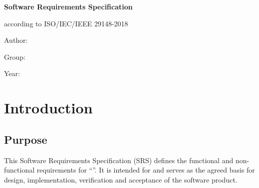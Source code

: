 \documentclass[12pt,a4paper]{extarticle}
\begin{document}
\sloppy

\begin{center}
{\large\bfseries Software Requirements Specification\par}
\vspace{2pt}
{\normalsize according to ISO/IEC/IEEE 29148-2018\par}
\vspace{16pt}
{\large\bfseries \ifhseHasNameEn\hseProjectNameEn\else\projectname\fi\par}
\vspace{18pt}
{\normalsize
Author: \hseAuthorName\par
Group: \hseGroup\par
Year: \hseYear\par}
\end{center}

\vspace{6pt}

\begin{abstract}
\noindent This document specifies the software requirements for the system
\enquote{\ifhseHasNameEn\hseProjectNameEn\else\projectname\fi}. It is
structured in accordance with ISO/IEC/IEEE 29148-2018 (Systems and software
engineering~--- Life cycle processes~--- Requirements engineering), clause~9.6,
and is submitted as the English international-standard equivalent of the
Statement of Work. Each requirement is identified so that it can be traced to
design, implementation and verification artefacts.
\end{abstract}

\hypersetup{linkcolor=black}
\tableofcontents
\hypersetup{linkcolor=blue}
\clearpage

\section{Introduction}

\subsection{Purpose}
\label{sec:purpose}

This Software Requirements Specification (SRS) defines the functional and
non-functional requirements for \enquote{\ifhseHasNameEn\hseProjectNameEn\else\projectname\fi}.
It is intended for  and serves as the agreed basis for design, implementation,
verification and acceptance of the software product.
\end{document}
